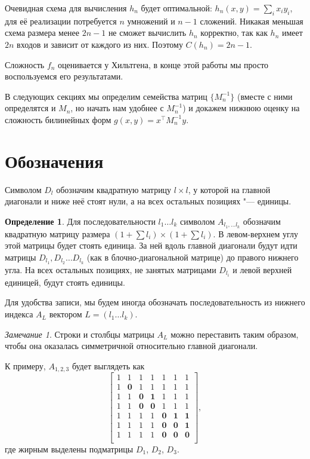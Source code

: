 \documentclass[oneside, a4paper]{article}
\theoremstyle{definition}
\newtheorem{definition}{Определение}
\theoremstyle{remark}
\newtheorem{remark}{Замечание}
\begin{document}
Очевидная схема для вычисления $h_n$ будет оптимальной: $h_n(x, y) = \sum_i x_i
y_i$, для её реализации потребуется $n$ умножений и $n - 1$ сложений. Никакая
меньшая схема размера менее $2n - 1$ не сможет вычислить $h_n$ корректно, так
как $h_n$ имеет $2n$ входов и зависит от каждого из них. Поэтому $C(h_n) = 2n - 1$.

Сложность $f_n$ оценивается у Хильтгена, в конце этой работы мы просто
воспользуемся его результатами.

В следующих секциях мы определим семейства матриц $\{M_n^{-1}\}$ (вместе с ними
определятся и $M_n$, но начать нам удобнее с $M_n^{-1}$) и докажем нижнюю оценку
на сложность билинейных форм $g(x, y) = x^\top M_n^{-1} y$.

\section{Обозначения}


Символом $D_l$ обозначим квадратную матрицу $l \times l$, у которой на главной
диагонали и ниже неё стоят нули, а на всех остальных позициях "--- единицы.

\begin{definition}
Для последовательности $l_1 \dots l_k$ символом $A_{l_1, \dots l_k}$ обозначим
квадратную матрицу размера $(1 + \sum l_i) \times (1 + \sum l_i)$. В левом-верхнем
углу этой матрицы будет стоять единица. За ней вдоль главной диагонали будут идти
матрицы $D_{l_1}, D_{l_2} \dots D_{l_k}$ (как в блочно-диагональной матрице) до
правого нижнего угла. На всех остальных позициях, не занятых матрицами $D_{l_i}$
и левой верхней единицей, будут стоять единицы.
\end{definition}

Для удобства записи, мы будем иногда обозначать последовательность из нижнего
индекса $A_L$ вектором $L = (l_1 \dots l_k)$.

\begin{remark}
Строки и столбцы матрицы $A_L$ можно переставить таким образом, чтобы она
оказалась симметричной относительно главной диагонали.
\end{remark}

К примеру, $A_{1, 2, 3}$ будет выглядеть как
\[
\begin{bmatrix}
1 & 1 & 1 & 1 & 1 & 1 & 1 \\
1 & \mathbf{0} & 1 & 1 & 1 & 1 & 1 \\
1 & 1 & \mathbf{0} & \mathbf{1} & 1 & 1 & 1 \\
1 & 1 & \mathbf{0} & \mathbf{0} & 1 & 1 & 1 \\
1 & 1 & 1 & 1 & \mathbf{0} & \mathbf{1} & \mathbf{1} \\
1 & 1 & 1 & 1 & \mathbf{0} & \mathbf{0} & \mathbf{1} \\
1 & 1 & 1 & 1 & \mathbf{0} & \mathbf{0} & \mathbf{0} \\
\end{bmatrix},
\]
где жирным выделены подматрицы $D_1$, $D_2$, $D_3$.
\end{document}
